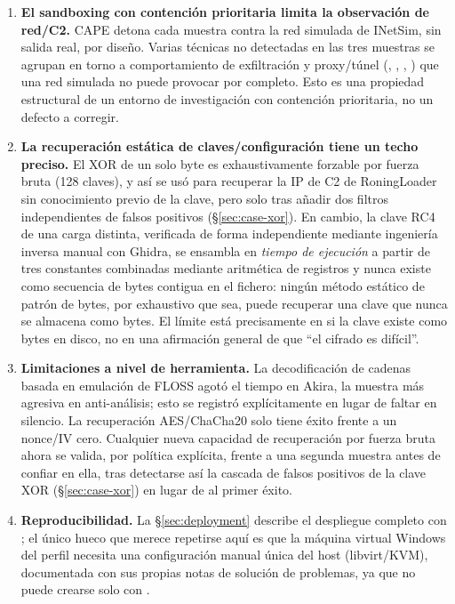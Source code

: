 \begin{enumerate}
\item \label{lim:containment} \textbf{El sandboxing con contenci\'on
  prioritaria limita la observaci\'on de red/C2.} CAPE detona cada muestra contra la red
  simulada de INetSim, sin salida real, por dise\~no. Varias t\'ecnicas
  no detectadas en las tres muestras se agrupan en torno a
  comportamiento de exfiltraci\'on y proxy/t\'unel
  (, , ,
  ) que una red simulada no puede provocar por
  completo. Esto es una propiedad estructural de un entorno de
  investigaci\'on con contenci\'on prioritaria, no un defecto a
  corregir.

\item \label{lim:key-ceiling} \textbf{La recuperaci\'on est\'atica de
  claves/configuraci\'on tiene un techo preciso.} El XOR de un solo byte es exhaustivamente
  forzable por fuerza bruta (128 claves), y as\'i se us\'o para
  recuperar la IP de C2 de RoningLoader sin conocimiento previo de la
  clave, pero solo tras a\~nadir dos filtros independientes de falsos
  positivos (\S\ref{sec:case-xor}). En cambio, la clave RC4 de una carga
  distinta, verificada de forma independiente mediante ingenier\'ia
  inversa manual con Ghidra, se ensambla en \emph{tiempo de
  ejecuci\'on} a partir de tres constantes combinadas mediante
  aritm\'etica de registros y nunca existe como secuencia de bytes
  contigua en el fichero: ning\'un m\'etodo est\'atico de patr\'on de
  bytes, por exhaustivo que sea, puede recuperar una clave que nunca se
  almacena como bytes. El l\'imite est\'a precisamente en si la clave
  existe como bytes en disco, no en una afirmaci\'on general de que
  ``el cifrado es dif\'icil''.

\item \label{lim:tool-constraints} \textbf{Limitaciones a nivel de
  herramienta.} La decodificaci\'on
  de cadenas basada en emulaci\'on de FLOSS agot\'o el tiempo en Akira,
  la muestra m\'as agresiva en anti-an\'alisis; esto se registr\'o
  expl\'icitamente en lugar de faltar en silencio. La recuperaci\'on
  AES/ChaCha20 solo tiene \'exito frente a un nonce/IV cero. Cualquier
  nueva capacidad de recuperaci\'on por fuerza bruta ahora se valida,
  por pol\'itica expl\'icita, frente a una segunda muestra antes de
  confiar en ella, tras detectarse as\'i la cascada de falsos positivos
  de la clave XOR (\S\ref{sec:case-xor}) en lugar de al primer \'exito.

\item \label{lim:reproducibility} \textbf{Reproducibilidad.} La \S\ref{sec:deployment} describe el
  despliegue completo con ; el \'unico hueco que
  merece repetirse aqu\'i es que la m\'aquina virtual Windows del
  perfil 
  necesita una configuraci\'on manual \'unica del host (libvirt/KVM),
  documentada con sus propias notas de soluci\'on de problemas, ya que
  no puede crearse solo con .


\end{enumerate}
